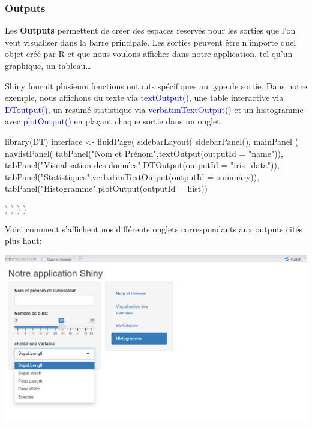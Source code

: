 \documentclass[
]{article}
\newenvironment{Shaded}{\begin{snugshade}}{\end{snugshade}}
\newcommand{\AttributeTok}[1]{\textcolor[rgb]{0.77,0.63,0.00}{#1}}
\newcommand{\FunctionTok}[1]{\textcolor[rgb]{0.00,0.00,0.00}{#1}}
\newcommand{\NormalTok}[1]{#1}
\newcommand{\OtherTok}[1]{\textcolor[rgb]{0.56,0.35,0.01}{#1}}
\newcommand{\StringTok}[1]{\textcolor[rgb]{0.31,0.60,0.02}{#1}}
\begin{document}
\hypertarget{outputs}{%
\subsubsection{Outputs}\label{outputs}}

Les \textbf{Outputs} permettent de créer des espaces reservés pour les
sorties que l'on veut visualiser dans la barre principale. Les sorties
peuvent être n'importe quel objet créé par R et que nous voulons
afficher dans notre application, tel qu'un graphique, un tableau\ldots{}

Shiny fournit plusieurs fonctions outputs spécifiques au type de sortie.
Dans notre exemple, nous affichons du texte via
\textcolor{blue}{textOutput()}, une table interactive via
\textcolor{blue}{DToutput()}, un resumé statistique via
\textcolor{blue}{verbatimTextOutput()} et un histogramme avec
\textcolor{blue}{plotOutput()} en plaçant chaque sortie dans un onglet.

\begin{Shaded}
\begin{Highlighting}[]
\FunctionTok{library}\NormalTok{(DT)}
\NormalTok{interface }\OtherTok{\textless{}{-}} \FunctionTok{fluidPage}\NormalTok{(}
  \FunctionTok{sidebarLayout}\NormalTok{(}
  \FunctionTok{sidebarPanel}\NormalTok{(),}
\FunctionTok{mainPanel}\NormalTok{ (}
 \FunctionTok{navlistPanel}\NormalTok{(}
    \FunctionTok{tabPanel}\NormalTok{(}\StringTok{"Nom et Prénom"}\NormalTok{,}\FunctionTok{textOutput}\NormalTok{(}\AttributeTok{outputId =} \StringTok{"name"}\NormalTok{)),}
    \FunctionTok{tabPanel}\NormalTok{(}\StringTok{"Visualisation des données"}\NormalTok{,}\FunctionTok{DTOutput}\NormalTok{(}\AttributeTok{outputId =} \StringTok{"iris\_data"}\NormalTok{)),}
    \FunctionTok{tabPanel}\NormalTok{(}\StringTok{"Statistiques"}\NormalTok{,}\FunctionTok{verbatimTextOutput}\NormalTok{(}\AttributeTok{outputId =} \StringTok{\textquotesingle{}summary\textquotesingle{}}\NormalTok{)),}
    \FunctionTok{tabPanel}\NormalTok{(}\StringTok{"Histogramme"}\NormalTok{,}\FunctionTok{plotOutput}\NormalTok{(}\AttributeTok{outputId =} \StringTok{\textquotesingle{}hist\textquotesingle{}}\NormalTok{))}
  
\NormalTok{      )}
\NormalTok{    )}
\NormalTok{  )}
\NormalTok{)}
\end{Highlighting}
\end{Shaded}

Voici comment s'affichent nos différents onglets correspondants aux
outputs cités plus haut:

\includegraphics{images/clipboard-247858739.png}
\end{document}
